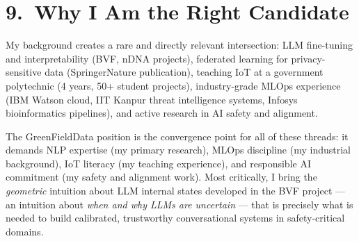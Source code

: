 \documentclass[11pt,a4paper]{article}
\begin{document}
\section{9.\ Why I Am the Right Candidate}

My background creates a rare and directly relevant intersection: LLM fine-tuning and
interpretability (BVF, nDNA projects), federated learning for privacy-sensitive data
(SpringerNature publication), teaching IoT at a government polytechnic (4 years, 50+ student
projects), industry-grade MLOps experience (IBM Watson cloud, IIT Kanpur threat intelligence
systems, Infosys bioinformatics pipelines), and active research in AI safety and alignment.

The GreenFieldData position is the convergence point for all of these threads:
it demands NLP expertise (my primary research), MLOps discipline (my industrial background),
IoT literacy (my teaching experience), and responsible AI commitment (my safety and alignment work).
Most critically, I bring the \emph{geometric} intuition about LLM internal states developed in the
BVF project — an intuition about \emph{when and why LLMs are uncertain} — that is
precisely what is needed to build calibrated, trustworthy conversational systems in safety-critical domains.



\end{document}
